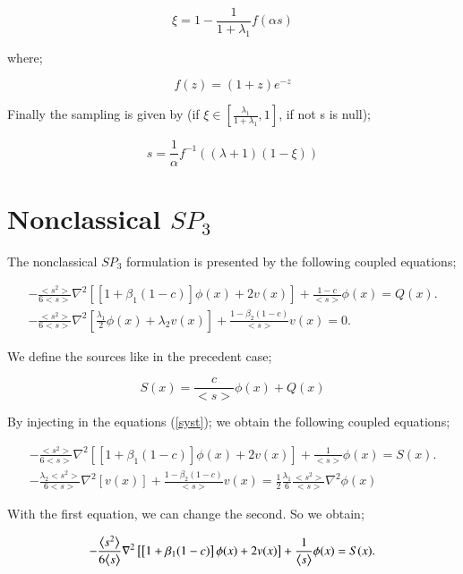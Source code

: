 \documentclass[preprint,12pt]{elsarticle}
\newcommand{\bl}{\big<}
\newcommand{\bg}{\big>}
\begin{document}
\begin{equation}
\xi = 1 - \frac{1}{1+\lambda_1}f(\alpha s)
\end{equation}

where;

\begin{equation}
f(z) = (1+z)e^{-z}
\end{equation}

Finally the sampling is given by (if $\xi \in [\frac{\lambda_1}{1+\lambda_1},1]$, if not s is null);

\begin{equation}
s =\frac{1}{\alpha}f^{-1}((\lambda+1)(1-\xi)) 
\end{equation}

\section{Nonclassical $SP_3$}\label{sec5}
The nonclassical $SP_3$ formulation is presented by the following coupled equations;

\begin{align}\label{syst}
-\frac{\bl s^2 \bg}{6\bl s \bg} \nabla^2 \left[\left[1+\beta_1(1-c)\right]\phi(x)+ 2v(x)\right] + \frac{1-c}{\bl s \bg} \phi(x) = Q(x). \\
-\frac{\bl s^2 \bg}{6\bl s \bg} \nabla^2 \left[\frac{\lambda_1}{2}\phi(x)+ \lambda_2v(x)\right] + \frac{1-\beta_2(1-c)}{\bl s \bg} v(x) = 0. 
\end{align}

We define the sources like in the precedent case;

\begin{equation}
S(x) = \frac{c}{\bl s \bg} \phi(x) + Q(x)
\end{equation}

By injecting in the equations (\ref{syst}); we obtain the following coupled equations;

\begin{align}
-\frac{\bl s^2 \bg}{6\bl s \bg} \nabla^2 \left[\left[1+\beta_1(1-c)\right]\phi(x)+ 2v(x)\right] + \frac{1}{\bl s \bg} \phi(x) = S(x). \\
-\frac{\lambda_2 \bl s^2 \bg}{6\bl s \bg} \nabla^2 \left[v(x)\right] + \frac{1-\beta_2(1-c)}{\bl s \bg} v(x) = \frac{1}{2}\frac{\lambda_1}{6}\frac{\bl s^2 \bg}{\bl s \bg} \nabla^2 \phi(x)
\end{align}

With the first equation, we can change the second. So we obtain;

\begin{equation}
-\frac{\bl s^2 \bg}{6\bl s \bg} \nabla^2 \left[\left[1+\beta_1(1-c)\right]\phi(x)+ 2v(x)\right] + \frac{1}{\bl s \bg} \phi(x) = S(x). \\
\end{equation}
\end{document}
